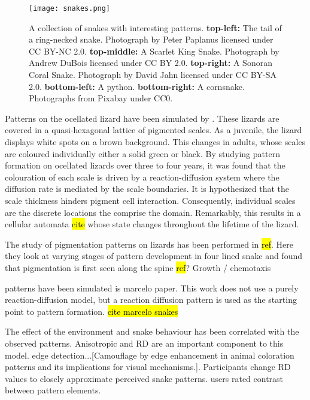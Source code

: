 
\begin{figure}[hb]
	\centering
	\texttt{[image: snakes.png]}
	\caption{A collection of snakes with interesting patterns. \textbf{top-left:} The tail of a ring-necked snake. Photograph by Peter Paplanus licensed under CC BY-NC 2.0. \textbf{top-middle:} A Scarlet King Snake. Photograph by Andrew DuBois licensed under CC BY 2.0. \textbf{top-right:} A Sonoran Coral Snake. Photograph by David Jahn licensed under CC BY-SA 2.0. \textbf{bottom-left:} A python. \textbf{bottom-right:} A cornsnake. Photographs from Pixabay under CC0.}
	\label{fig:realSnakePatterns}
\end{figure}

Patterns on the ocellated lizard have been simulated by \cite{manukyan2017}. These lizards are covered in a quasi-hexagonal lattice of pigmented scales. As a juvenile, the lizard displays white spots on a brown background. This changes in adults, whose scales are coloured individually either a solid green or black. By studying pattern formation on ocellated lizards over three to four years, it was found that the colouration of each scale is driven by a reaction-diffusion system where the diffusion rate is mediated by the scale boundaries. It is hypothesized that the scale thickness hinders pigment cell interaction. Consequently, individual scales are the discrete locations the comprise the domain. Remarkably, this results in a cellular automata \hl{cite} whose state changes throughout the lifetime of the lizard.

The study of pigmentation patterns on lizards has been performed in \hl{ref}. Here they look at varying stages of pattern development in four lined snake and found that pigmentation is first seen along the spine \hl{ref}? Growth / chemotaxis 


patterns have been simulated is marcelo paper. This work does not use a purely reaction-diffusion model, but a reaction diffusion pattern is used as the starting point to pattern formation. \hl{cite marcelo snakes}

The effect of the environment and snake behaviour has been correlated with the observed patterns. Anisotropic and RD are an important component to this model. edge detection...[Camouflage by edge enhancement in animal coloration patterns and its implications for visual mechanisms.]. Participants change RD values to closely approximate perceived snake patterns. users rated contrast between pattern elements.

